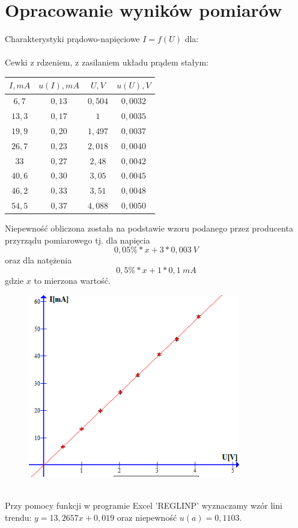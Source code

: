 \documentclass{article}
\begin{document}
\section{Opracowanie wyników pomiarów}
Charakterystyki prądowo-napięciowe $I = f(U)$ dla:\\\\
Cewki z rdzeniem, z zasilaniem układu prądem stałym:
\begin{center}
    \begin{tabular}{|c|c|c|c|}
    \hline
$I,mA$ & $u(I), mA$ & $U,V$ & $u(U), V$ \\ \hline
$6,7$ & $0,13$ & $0,504$ & $0,0032$\\ \hline
$13,3$ & $0,17$ & $1$ & $0,0035$\\ \hline
$19,9$ & $0,20$ & $1,497$ & $0,0037$\\ \hline
$26,7$ & $0,23$ & $2,018$ & $0,0040$\\ \hline
$33$ & $0,27$ & $2,48$ & $0,0042$\\ \hline
$40,6$ & $0,30$ & $3,05$ & $0,0045$\\ \hline
$46,2$ & $0,33$ & $3,51$ & $0,0048$\\ \hline
$54,5$ & $0,37$ & $4,088$ & $0,0050$\\ \hline
    \end{tabular}
\end{center}
Niepewność obliczona została na podstawie wzoru podanego przez producenta przyrządu pomiarowego tj. dla napięcia
$$0,05\% * x + 3 * 0,003\ V $$
oraz dla natężenia
$$0,5\% * x + 1 * 0,1\ mA$$
gdzie $x$ to mierzona wartość.
\begin{figure}[ht]
\centering
\includegraphics[height=8cm]{wykres_1.png}
\end{figure}\\
Przy pomocy funkcji w programie Excel 'REGLINP' wyznaczamy wzór lini trendu: $y = 13,2657x + 0,019$ oraz niepewność $u(a) = 0,1103$.\\
\end{document}
